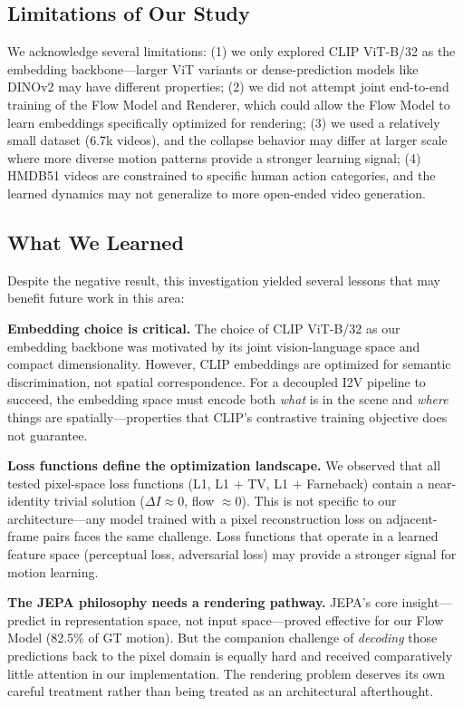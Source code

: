 \documentclass[10pt,twocolumn,letterpaper]{article}
\begin{document}
\subsection{Limitations of Our Study}

We acknowledge several limitations: (1) we only explored CLIP ViT-B/32 as
the embedding backbone---larger ViT variants or dense-prediction models
like DINOv2 may have different properties; (2) we did not attempt joint
end-to-end training of the Flow Model and Renderer, which could allow the
Flow Model to learn embeddings specifically optimized for rendering; (3)
we used a relatively small dataset (6.7k videos), and the collapse
behavior may differ at larger scale where more diverse motion patterns
provide a stronger learning signal; (4) HMDB51 videos are constrained to
specific human action categories, and the learned dynamics may not
generalize to more open-ended video generation.

\subsection{What We Learned}

Despite the negative result, this investigation yielded several lessons
that may benefit future work in this area:

\textbf{Embedding choice is critical.} The choice of CLIP ViT-B/32 as our
embedding backbone was motivated by its joint vision-language space and
compact dimensionality. However, CLIP embeddings are optimized for semantic
discrimination, not spatial correspondence. For a decoupled I2V pipeline
to succeed, the embedding space must encode both \emph{what} is in the
scene and \emph{where} things are spatially---properties that CLIP's
contrastive training objective does not guarantee.

\textbf{Loss functions define the optimization landscape.} We observed
that all tested pixel-space loss functions (L1, L1 + TV, L1 + Farneback)
contain a near-identity trivial solution ($\Delta I \approx 0$, flow
$\approx 0$). This is not specific to our architecture---any model trained
with a pixel reconstruction loss on adjacent-frame pairs faces the same
challenge. Loss functions that operate in a learned feature space
(perceptual loss, adversarial loss) may provide a stronger signal for
motion learning.

\textbf{The JEPA philosophy needs a rendering pathway.} JEPA's core
insight---predict in representation space, not input space---proved
effective for our Flow Model (82.5\% of GT motion). But the companion
challenge of \emph{decoding} those predictions back to the pixel domain is
equally hard and received comparatively little attention in our
implementation. The rendering problem deserves its own careful treatment
rather than being treated as an architectural afterthought.
\end{document}
